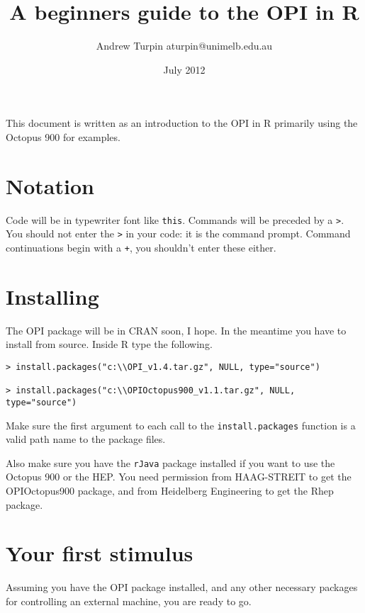\documentclass{article}
\title{A beginners guide to the OPI in R}
\date{July 2012}
\author{Andrew Turpin aturpin@unimelb.edu.au}
\begin{document}
\maketitle

This document is written as an introduction to the OPI in R primarily
using the Octopus 900 for examples.

\section{Notation}

Code will be in typewriter font like {\tt this}.
Commands will be preceded by a {\tt >}. You should not enter the {\tt >} in your code: it is
the command prompt. Command continuations begin with a {\tt +}, you shouldn't enter these
either.

\section{Installing}
\label{sec-install}

The OPI package will be in CRAN soon, I hope. In the meantime you have to install from source.
Inside R type the following.

\begin{verbatim}
> install.packages("c:\\OPI_v1.4.tar.gz", NULL, type="source")

> install.packages("c:\\OPIOctopus900_v1.1.tar.gz", NULL, type="source")
\end{verbatim}

Make sure the first argument to each call to the {\tt install.packages}
function is a valid path name to the package files.

Also make sure you have the {\tt rJava} package installed if you
want to use the Octopus 900 or the HEP. You need permission from
HAAG-STREIT to get the OPIOctopus900 package, and from Heidelberg
Engineering to get the Rhep package.




\section{Your first stimulus}

Assuming you have the OPI package installed, and any other necessary
packages for controlling an external machine, you are ready to go.
\end{document}
